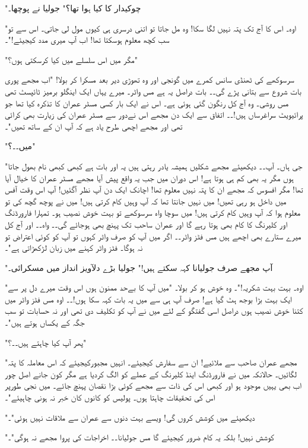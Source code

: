 "چوکیدار کا کیا ہوا تھا؟" جولیا نے پوچھا۔

"اوہ۔ اس کا آج تک پتہ نہیں لگا سکا! وہ مل جاتا تو اتنی درسری ہی کیوں مول لی جاتی۔ اس سے تو سب کچھ معلوم ہوسکتا تھا! اب آپ میری مدد کیجیئے!"۔

"مگر میں اس سلسلے میں کیا کرسکتی ہوں؟"

سرسوکھے کی ٹھنڈی سانس کمرے میں گونجی اور وہ تھوڑی دیر بعد مسکرا کر بولا! "اب مجھے پوری بات شروع سے بتانی پڑے گی۔۔ بات دراصل یہ ہے مس واٹر۔ میرے یہاں ایک اینگلو برمیز ٹائپسٹ تھی مس روشی۔ وہ آج کل رنگون گئی ہوئی ہے۔ اس نے ایک بار کسی مسٹر عمران کا تذکرہ کیا تھا جو پرائیویٹ سراغرساں ہیں!۔۔ اتفاق سے ایک دن مجھے اس نےدور سے مسٹر عمران کی زیارت بھی کرائی تھی اور مجھے اچھی طرح یاد ہے کہ آپ ان کے ساتھ تھیں"۔

"میں۔۔؟"

"جی ہاں۔ آپ۔۔ دیکھیئے مجھے شکلیں ہمیشہ یادر رہتی ہیں یہ اور بات ہے کبھی کبھی نام بھول جاتا ہوں مگر یہ بھی کم ہی ہوتا ہے! اس دوران میں جب یہ واقع پیش آیا مجھے مسٹر عمران کا خیال آیا تھا! مگر افسوس کہ مجھے ان کا پتہ نہیں معلوم تھا! اچانک ایک دن آپ نظر آگئیں! آپ اس وقت آفس میں داخل ہو رہی تھیں! میں نہیں جانتا تھا کہ آپ وہیں کام کرتی ہیں! میں نے پوچھ گچھ کی تو معلوم ہوا کہ آپ وہیں کام کرتی ہیں! میں سوچا واہ سرسوکھے تو بہت خوش نصیب ہو۔ تمہارا فارورڈنگ اور کلیرنگ کا کام بھی ہوتا رہے گا اور عمران ساحب تک پہنچ بھی ہوجائے گی۔۔ واہ۔۔ اور آج کل میرے ستارے بھی اچھے ہیں مس فٹز واٹر۔۔ اگر میں آپ کو صرف واٹر کہوں تو آپ کو کوئی اعتراض تو نہ ہوگا۔ فٹز واٹر کہنے میں زبان لڑکھڑاتی ہے"۔

"آپ مجھے صرف جولیانا کہہ سکتے ہیں!" جولیا بڑے دلآویز انداز میں مسکرائی۔

"اوہ۔ بہت بہت شکریہ!"۔ وہ خوش ہو کر بولا۔ "میں آپ کا بےحد ممنون ہوں اس وقت میرے دل پر سے ایک بہت بڑا بوجھ ہٹ گیا ہے! صرف آپ ہی سے میں یہ بات کہہ سکا ہوں!۔۔ اوہ مس فٹز واٹر میں کتنا خوش نصیب ہوں دراصل اسی گفتگو کے لئے میں نے آپ کو تکلیف دی تھی اور نہ حسابات تو سب جگہ کے یکساں ہوتے ہیں"۔

"پھر آپ کیا چاہتے ہیں۔۔؟"

"مجھے عمران صاحب سے ملائیے! ان سے سفارش کیجیئے۔ انہیں مجبورکیجیئے کہ اس معاملہ کا پتہ لگائیں۔ حالانکہ میں نے فارورڈنگ اینڈ کلیرنگ کے عملے کو الگ کردیا ہے مگر کون جانے اصل چور اب بھی یہیں موجود ہو اور کبھی اس کی ذات سے مجھے کوئی بڑا نقصان پہنچ جائے۔ میں نجی طورپر اس کی تحقیقات چاہتا ہوں۔ پولیس کو کانوں کان خبر نہ ہونی چاہیئے"۔

"دیکھیئے میں کوشش کروں گی! ویسے بہت دنوں سے عمران سے ملاقات نہیں ہوئی"۔

"کوشش نہیں! بلکہ یہ کام ضرور کیجیئے گا مس جولیانا۔۔ اخراجات کی پروا مجھے نہ ہوگی"۔

